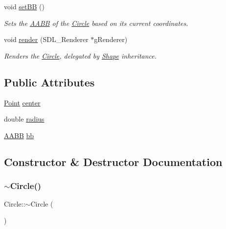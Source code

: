 \begin{DoxyCompactItemize}
void \mbox{\hyperlink{class_circle_ab33a020a2b85fbda10aa82c6e8c25327}{set\+BB}} ()
\begin{DoxyCompactList}\small\item\em Sets the \mbox{\hyperlink{class_a_a_b_b}{A\+A\+BB}} of the \mbox{\hyperlink{class_circle}{Circle}} based on its current coordinates. \end{DoxyCompactList}\item 
void \mbox{\hyperlink{class_circle_a7236be8080b9ab07f5c26e34aa17c9ae}{render}} (S\+D\+L\+\_\+\+Renderer $\ast$g\+Renderer)
\begin{DoxyCompactList}\small\item\em Renders the \mbox{\hyperlink{class_circle}{Circle}}, delegated by \mbox{\hyperlink{class_shape}{Shape}} inheritance. \end{DoxyCompactList}\end{DoxyCompactItemize}
\subsection*{Public Attributes}
\begin{DoxyCompactItemize}
\item 
\mbox{\hyperlink{class_point}{Point}} \mbox{\hyperlink{class_circle_a8c4026a5a34d2df1527f019dd456317b}{center}}
\item 
double \mbox{\hyperlink{class_circle_a5a0212ba705f57d762bd6b202e3d10ed}{radius}}
\item 
\mbox{\hyperlink{class_a_a_b_b}{A\+A\+BB}} \mbox{\hyperlink{class_circle_a41d311e1f5e7001277e61ebe6560f523}{bb}}
\end{DoxyCompactItemize}


\subsection{Constructor \& Destructor Documentation}
\mbox{\label{class_circle_ae3f30436e645d73e368e8ee55f8d1650}} 
\subsubsection{\texorpdfstring{$\sim$Circle()}{~Circle()}}
{\footnotesize\ttfamily Circle\+::$\sim$\+Circle (\begin{DoxyParamCaption}{ }\end{DoxyParamCaption})}



